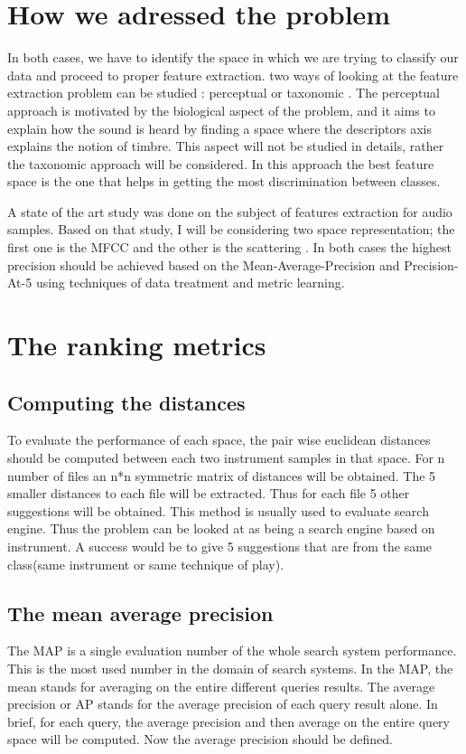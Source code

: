 \documentclass[hidelinks,12pt]{report}
\begin{document}
\section{How we adressed the problem}
In both cases, we have to identify the space in which we are trying to classify our data and proceed to proper feature extraction. two ways of looking at the feature extraction problem can be studied : perceptual or taxonomic \cite{P03}. The perceptual approach is motivated by the biological aspect of the problem, and it aims to explain how the sound is heard by finding a space where the descriptors axis explains the notion of timbre. This aspect will not be studied in details, rather the taxonomic approach will be considered. In this approach the best feature space is the one that helps in getting the most discrimination between classes.\par
A state of the art study was done on the subject of features extraction for audio samples. Based on that study, I will be considering two space representation; the first one is the MFCC and the other is the scattering \cite{AM11}. In both cases the highest precision should be achieved based on the Mean-Average-Precision and Precision-At-5 using techniques of data treatment and metric learning. 

\section{The ranking metrics}
\subsection{Computing the distances}
To evaluate the performance of each space,  the pair wise euclidean distances should be computed between each two instrument samples in that space. For n number of files an n*n symmetric matrix of distances will be obtained. The 5 smaller distances to each file  will be extracted. Thus for each file 5 other suggestions will be obtained. This method is usually used to evaluate search engine. Thus the problem can be looked at as being a search engine based on instrument. A success would be to give 5 suggestions that are from the same class(same instrument or same technique of play).
\subsection{The mean average precision}
The MAP is a single evaluation number of the whole search system performance. This is the most used number in the domain of search systems. In the MAP, the mean stands for averaging on the entire different queries results. The average precision or AP stands for the average precision of each query result alone. In brief, for each query, the average precision and then average on the entire query space will be computed. Now the average precision should be defined.
\end{document}
